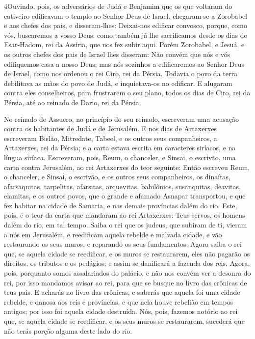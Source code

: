 \medskip

\lettrine{4} Ouvindo, pois, os adversários de Judá e Benjamim
que os que voltaram do cativeiro edificavam o templo ao Senhor Deus
de Israel, chegaram-se a Zorobabel e aos chefes dos pais, e
disseram-lhes: Deixai-nos edificar convosco, porque, como vós,
buscaremos a vosso Deus; como também já lhe sacrificamos desde os
dias de Esar-Hadom, rei da Assíria, que nos fez subir aqui.
Porém Zorobabel, e Jesuá, e os outros chefes dos pais de Israel
lhes disseram: Não convém que nós e vós edifiquemos casa a nosso
Deus; mas nós sozinhos a edificaremos ao Senhor Deus de Israel, como
nos ordenou o rei Ciro, rei da Pérsia. Todavia o povo da terra
debilitava as mãos do povo de Judá, e inquietava-os no edificar.
E alugaram contra eles conselheiros, para frustrarem o seu
plano, todos os dias de Ciro, rei da Pérsia, até ao reinado de
Dario, rei da Pérsia.

No reinado de Assuero, no princípio do seu reinado, escreveram uma
acusação contra os habitantes de Judá e de Jerusalém. E nos dias
de Artaxerxes escreveram Bislão, Mitredate, Tabeel, e os outros seus
companheiros, a Artaxerxes, rei da Pérsia; e a carta estava escrita
em caracteres siríacos, e na língua siríaca. Escreveram, pois,
Reum, o chanceler, e Sinsai, o escrivão, uma carta contra Jerusalém,
ao rei Artaxerxes do teor seguinte: Então escreveu Reum, o
chanceler, e Sinsai, o escrivão, e os outros seus companheiros, os
dinaítas, afarsaquitas, tarpelitas, afarsitas, arquevitas,
babilônios, susanquitas, deavitas, elamitas, e os outros
povos, que o grande e afamado Asnapar transportou, e que fez habitar
na cidade de Samaria, e nas demais províncias dalém do rio.
Este, pois, é o teor da carta que mandaram ao rei Artaxerxes:
Teus servos, os homens dalém do rio, em tal tempo. Saiba o
rei que os judeus, que subiram de ti, vieram a nós em Jerusalém, e
reedificam aquela rebelde e malvada cidade, e vão restaurando os
seus muros, e reparando os seus fundamentos. Agora saiba o
rei que, se aquela cidade se reedificar, e os muros se restaurarem,
eles não pagarão os direitos, os tributos e os pedágios; e assim se
danificará a fazenda dos reis. Agora, pois, porquanto somos
assalariados do palácio, e não nos convém ver a desonra do rei, por
isso mandamos avisar ao rei, para que se busque no livro das
crônicas de teus pais. E acharás no livro das crônicas, e saberás
que aquela foi uma cidade rebelde, e danosa aos reis e províncias, e
que nela houve rebelião em tempos antigos; por isso foi aquela
cidade destruída. Nós, pois, fazemos notório ao rei que, se
aquela cidade se reedificar, e os seus muros se restaurarem,
sucederá que não terás porção alguma deste lado do rio.

